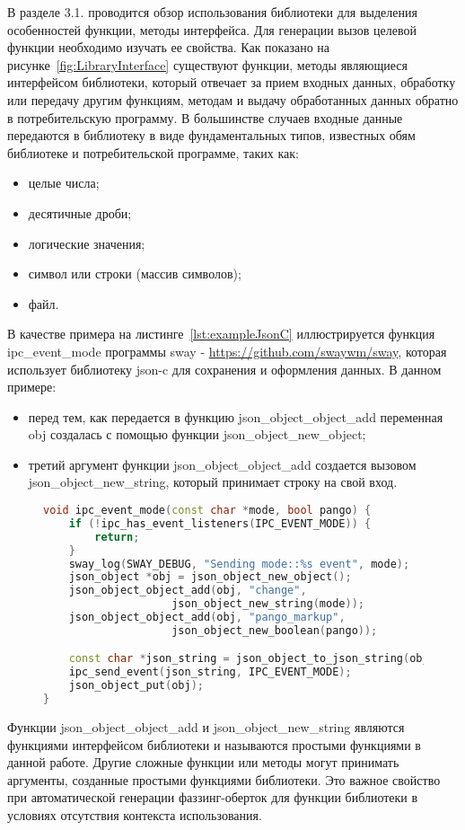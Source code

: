 В разделе 3.1. проводится обзор использования библиотеки для выделения особенностей функции, методы интерфейса. Для генерации вызов целевой функции необходимо изучать ее свойства. Как показано на рисунке~\cref{fig:LibraryInterface} существуют функции, методы являющиеся интерфейсом библиотеки, который отвечает за прием входных данных, обработку или передачу другим функциям, методам и выдачу обработанных данных обратно в потребительскую программу. В большинстве случаев входные данные передаются в библиотеку в виде фундаментальных типов, известных обям библиотеке и потребительской программе, таких как:

\begin{itemize}
    \item целые числа;
    \item десятичные дроби;
    \item логические значения;
    \item символ или строки (массив символов);
    \item файл.
\end{itemize}

В качестве примера на листинге~\cref{lst:exampleJsonC} иллюстрируется функция ipc\_event\_mode программы sway - \url{https://github.com/swaywm/sway}, которая использует библиотеку json-c для сохранения и оформления данных. В данном примере:

\begin{itemize}
    \item перед тем, как передается в функцию json\_object\_object\_add переменная obj создалась с помощью функции json\_object\_new\_object\(\);
    \item третий аргумент функции json\_object\_object\_add\(\) создается вызовом json\_object\_new\_string, который принимает строку на свой вход.
\end{itemize}

\begin{figure}[thp]
\begin{lstlisting}[language=C++,frame=single,caption={Пример использования библиотеки},label=lst:exampleJsonC]
void ipc_event_mode(const char *mode, bool pango) {
    if (!ipc_has_event_listeners(IPC_EVENT_MODE)) {
        return;
    }
    sway_log(SWAY_DEBUG, "Sending mode::%s event", mode);
    json_object *obj = json_object_new_object();
    json_object_object_add(obj, "change", 
                    json_object_new_string(mode));
    json_object_object_add(obj, "pango_markup",
                    json_object_new_boolean(pango));

    const char *json_string = json_object_to_json_string(obj);
    ipc_send_event(json_string, IPC_EVENT_MODE);
    json_object_put(obj);
}
\end{lstlisting}
\end{figure}
Функции json\_object\_object\_add и json\_object\_new\_string являются функциями интерфейсом библиотеки и называются простыми функциями в данной работе. Другие сложные функции или методы могут принимать аргументы, созданные простыми функциями библиотеки. Это важное свойство при автоматической генерации фаззинг-оберток для функции библиотеки в условиях отсутствия контекста использования.

